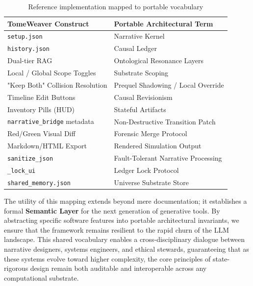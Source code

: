 \documentclass[12pt, a4paper]{article}
\begin{document}
\vspace{1em}
\begin{table}[h!]
\centering
\renewcommand{\arraystretch}{1.4} %
\begin{tabular}{p{} p{}}
\toprule
\textbf{TomeWeaver Construct} & \textbf{Portable Architectural Term} \\
\midrule
\texttt{setup.json} & Narrative Kernel \\
\texttt{history.json} & Causal Ledger \\
Dual-tier RAG & Ontological Resonance Layers \\
Local / Global Scope Toggles & Substrate Scoping \\
"Keep Both" Collision Resolution & Prequel Shadowing / Local Override \\
Timeline Edit Buttons & Causal Revisionism \\
Inventory Pills (HUD) & Stateful Artifacts \\
\texttt{narrative\_bridge} metadata & Non-Destructive Transition Patch \\
Red/Green Visual Diff & Forensic Merge Protocol \\
Markdown/HTML Export & Rendered Simulation Output \\
\texttt{sanitize\_json} & Fault-Tolerant Narrative Processing \\
\texttt{\_lock\_ui} & Ledger Lock Protocol \\
\texttt{shared\_memory.json} & Universe Substrate Store \\
\bottomrule
\end{tabular}
\vspace{0.5em}
\caption{Reference implementation mapped to portable vocabulary}
\end{table}

The utility of this mapping extends beyond mere documentation; it establishes a formal \textbf{Semantic Layer} for the next generation of generative tools. By abstracting specific software features into portable architectural invariants, we ensure that the framework remains resilient to the rapid churn of the LLM landscape. This shared vocabulary enables a cross-disciplinary dialogue between narrative designers, systems engineers, and ethical stewards, guaranteeing that as these systems evolve toward higher complexity, the core principles of state-rigorous design remain both auditable and interoperable across any computational substrate.
\end{document}
